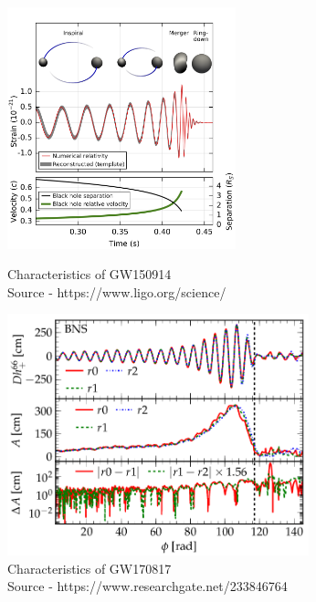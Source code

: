 \begin{figure}[h]
   \begin{minipage}{0.6\textwidth}
     \centering
     \includegraphics[height = 7cm , width  4 cm]{images.tex/GW150914.png}
     \caption{Characteristics of GW150914\\ Source - https://www.ligo.org/science/}
   \end{minipage}\hfill
   \begin{minipage}{0.6\textwidth}
     \centering
     \includegraphics[height = 7cm ,width = 8 cm]{images.tex/GW170817.png}
     \caption{Characteristics of GW170817\\ Source - https://www.researchgate.net/233846764}
   \end{minipage}
\end{figure}